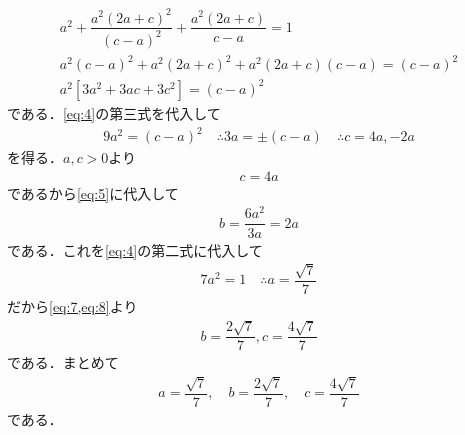 \documentclass[../../main.tex]{subfiles}
\begin{document}
\begin{align}
  a^2 + \dfrac{a^2(2a+c)^2}{(c-a)^2} + \dfrac{a^2(2a+c)}{c-a} = 1 \\
  a^2(c-a)^2 + a^2(2a+c)^2 + a^2(2a+c)(c-a) = (c-a)^2 \\
  a^2\left[ 3a^2 + 3ac + 3c^2 \right] = (c-a)^2 \label{eq:6}
\end{align}
である．\cref{eq:4}の第三式を代入して
\begin{align}
  9a^2 = (c-a)^2 \quad
  \therefore
  3a = \pm(c-a) \quad
  \therefore
  c= 4a, -2a
\end{align}
を得る．$a,c>0$より
\begin{align}
  c=4a \label{eq:7}
\end{align}
であるから\cref{eq:5}に代入して
\begin{align}
  b = \dfrac{6a^2}{3a} = 2a \label{eq:8}
\end{align}
である．これを\cref{eq:4}の第二式に代入して
\begin{align}
  7a^2 = 1 \quad \therefore a = \dfrac{\sqrt{7}}{7}
\end{align}
だから\cref{eq:7,eq:8}より
\begin{align}
  b = \dfrac{2\sqrt{7}}{7}, c = \dfrac{4\sqrt{7}}{7}
\end{align}
である．まとめて
\begin{align}
  a = \dfrac{\sqrt{7}}{7}, \quad
  b = \dfrac{2\sqrt{7}}{7}, \quad
  c = \dfrac{4\sqrt{7}}{7}
\end{align}
である．
\end{document}
